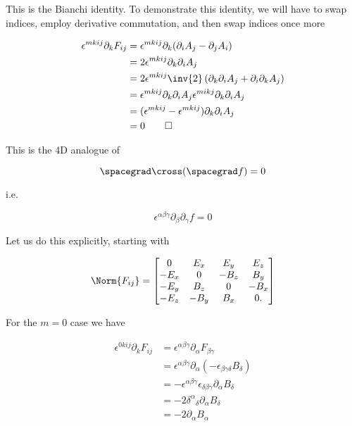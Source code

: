 This is the Bianchi identity.  To demonstrate this identity, we will have to swap indices, employ derivative commutation, and then swap indices once more

\begin{equation}\label{eqn:relativisticElectrodynamicsL11b:1380}
\begin{aligned}
\epsilon^{m k i j} \partial_k F_{i j} 
&= \epsilon^{m k i j} \partial_k (\partial_i A_j - \partial_j A_i) \\
&= 2 \epsilon^{m k i j} \partial_k \partial_i A_j \\
&= 2 \epsilon^{m k i j} \inv{2} \left( \partial_k \partial_i A_j + \partial_i \partial_k A_j \right) \\
&= 
\epsilon^{m k i j} \partial_k \partial_i A_j 
\epsilon^{m i k j} \partial_k \partial_i A_j  \\
&= 
(\epsilon^{m k i j} - \epsilon^{m k i j}) \partial_k \partial_i A_j \\
&= 0 \qquad \square
\end{aligned}
\end{equation}

This is the 4D analogue of 

\begin{equation}\label{eqn:relativisticElectrodynamicsL11:790}
\spacegrad \cross (\spacegrad f) = 0
\end{equation}

i.e.

\begin{equation}\label{eqn:relativisticElectrodynamicsL11:810}
\epsilon^{\alpha\beta\gamma} \partial_\beta \partial_\gamma f = 0
\end{equation}

Let us do this explicitly, starting with

\begin{equation}\label{eqn:relativisticElectrodynamicsL11:370b}
\Norm{ F_{i j} } = 
\begin{bmatrix}
0 & E_x & E_y & E_z \\
-E_x & 0 & -B_z & B_y \\
-E_y & B_z & 0 & -B_x \\
-E_z & -B_y & B_x & 0.
\end{bmatrix}
\end{equation}

For the $m= 0$ case we have

\begin{equation}\label{eqn:relativisticElectrodynamicsL11b:1400}
\begin{aligned}
\epsilon^{0 k i j} \partial_k F_{i j}
&=
\epsilon^{\alpha \beta \gamma} \partial_\alpha F_{\beta \gamma} \\
&= 
\epsilon^{\alpha \beta \gamma} \partial_\alpha (-\epsilon_{\beta \gamma \delta} B_\delta) \\
&= 
-\epsilon^{\alpha \beta \gamma} \epsilon_{\delta \beta \gamma }
\partial_\alpha B_\delta \\
&= 
- 2 {\delta^\alpha}_\delta \partial_\alpha B_\delta \\
&= 
- 2 \partial_\alpha B_\alpha 
\end{aligned}
\end{equation}


